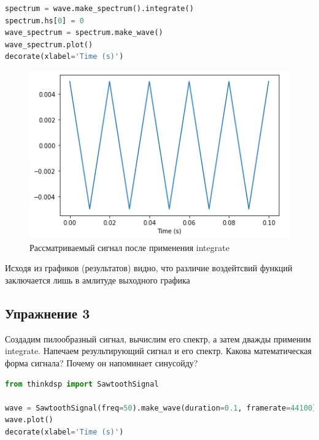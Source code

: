 \begin{lstlisting}[language=Python]
spectrum = wave.make_spectrum().integrate()
spectrum.hs[0] = 0
wave_spectrum = spectrum.make_wave()
wave_spectrum.plot()
decorate(xlabel='Time (s)')
\end{lstlisting}

\begin{figure}[H]
	\begin{center}
		\includegraphics[scale=1]{fig/lab09/lab09_06.png}
		\caption{Рассматриваемый сигнал после применения integrate}
	\end{center}
\end{figure}

Исходя из графиков (результатов) видно, что различие воздейтсвий функций заключается лишь в амлитуде выходного графика


\subsection{Упражнение 3}

Создадим пилообразный сигнал, вычислим его спектр, а затем дважды применим integrate. Напечаем результирующий сигнал и его спектр. Какова математическая форма сигнала? Почему он напоминает синусойду?

\begin{lstlisting}[language=Python]
from thinkdsp import SawtoothSignal

wave = SawtoothSignal(freq=50).make_wave(duration=0.1, framerate=44100)
wave.plot()
decorate(xlabel='Time (s)')
\end{lstlisting}

